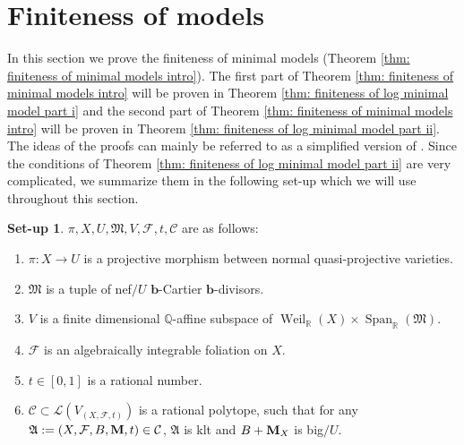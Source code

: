 \documentclass[12pt]{amsart}
\numberwithin{equation}{section}
\newcommand{\bb}{\bm{b}}
\newcommand{\Mm}{{\bf{M}}}
\newcommand{\Span}{\operatorname{Span}}
\newcommand{\Weil}{\operatorname{Weil}}
\newcommand{\Aa}{{\mathfrak{A}}}
\newcommand{\Ff}{\mathcal{F}}
\newcommand{\MM}{{\mathfrak{M}}}
\theoremstyle{definition}
\theoremstyle{definition}
\newtheorem{setup}[thm]{Set-up}
\theoremstyle{definition}
\begin{document}
\section{Finiteness of models}\label{sec: fom}

In this section we prove the finiteness of minimal models (Theorem \ref{thm: finiteness of minimal models intro}). The first part of Theorem \ref{thm: finiteness of minimal models intro} will be proven in Theorem \ref{thm: finiteness of log minimal model part i} and the second part of Theorem \ref{thm: finiteness of minimal models intro} will be proven in Theorem \ref{thm: finiteness of log minimal model part ii}. The ideas of the proofs can mainly be referred to \cite[Section 10]{HK10} as a simplified version of \cite[Section 7]{BCHM10}. Since the conditions of Theorem \ref{thm: finiteness of log minimal model part ii} are very complicated, we summarize them in the following set-up which we will use throughout this section. 

\begin{setup}\label{setup: finiteness of models}
$\pi, X,U,\MM,V,\Ff,t,\mathcal{C}$ are as follows:
\begin{enumerate}
    \item $\pi: X\rightarrow U$ is a projective morphism between normal quasi-projective varieties.
    \item $\MM$ is a tuple of nef$/U$ $\bb$-Cartier $\bb$-divisors.
    \item $V$ is a finite dimensional $\mathbb Q$-affine subspace of $\Weil_{\mathbb R}(X)\times\Span_{\mathbb R}(\MM)$.
    \item $\Ff$ is an algebraically integrable foliation on $X$.
    \item $t\in [0,1]$ is a rational number. 
    \item $\mathcal{C}\subset\mathcal{L}(V_{(X,\Ff,t)})$ is a rational polytope, such that for any $\Aa:=(X,\Ff,B,\Mm,t)\in\mathcal{C}$, $\Aa$ is klt and $B+\Mm_X$ is big$/U$.
\end{enumerate}
\end{setup}
\end{document}
